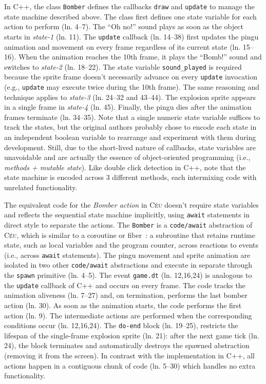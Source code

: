 \documentclass{vgtc}                          %
\newcommand{\CEU}{\textsc{C\'{e}u}\xspace}
\newcommand{\code}[1] {{\small{\texttt{#1}}}}
\begin{document}
In C++, the class \code{Bomber} defines the callbacks \code{draw} and
\code{update} to manage the state machine described above.
%
The class first defines one state variable for each action to perform
(ln. 4--7).
The ``Oh no!'' sound plays as soon as the object starts in \emph{state-1} 
(ln. 11).
The \code{update} callback (ln. 14--38) first updates the pingu animation and
movement on every frame regardless of its current state (ln. 15--16).
When the animation reaches the 10th frame, it plays the ``Bomb!'' sound and 
switches to \emph{state-2} (ln. 18--22).
The state variable \code{sound\_played} is required because the sprite frame
doesn't necessarily advance on every \code{update} invocation (e.g.,
\code{update} may execute twice during the 10th frame).
The same reasoning and technique applies to \emph{state-3} (ln. 24--32 and
43--44).
The explosion sprite appears in a single frame in \emph{state-4} (ln. 45).
Finally, the pingu dies after the animation frames terminate (ln. 34--35).
%
Note that a single numeric state variable suffices to track the states, but the
original authors probably chose to encode each state in an independent boolean 
variable to rearrange and experiment with them during development.
Still, due to the short-lived nature of callbacks, state variables are 
unavoidable and are actually the essence of object-oriented programming
(i.e., \emph{methods + mutable state}).
%
Like double click detection in C++, note that the state machine is encoded
across 3 different methods, each intermixing code with unrelated functionality.

The equivalent code for the \emph{Bomber action} in \CEU doesn't require state
variables and reflects the sequential state machine implicitly, using
\code{await} statements in direct style to separate the actions.
%
The \code{Bomber} is a \code{code/await} abstraction of \CEU, which is similar
to a coroutine or fiber~\cite{sync_async.cooperative}: a subroutine that
retains runtime state, such as local variables and the program counter, across
reactions to events (i.e., across \code{await} statements).
The pingu movement and sprite animation are isolated in two other
\code{code/await} abstractions and execute in separate through the \code{spawn}
primitive (ln. 4--5).
The event \code{game.dt} (ln. 12,16,24) is analogous to the \code{update}
callback of C++ and occurs on every frame.
%
The code tracks the animation aliveness (ln. 7--27) and, on termination,
performs the last bomber action (ln. 30).
As soon as the animation starts, the code performs the first action (ln. 9).
The intermediate actions are performed when the corresponding conditions occur
(ln. 12,16,24).
The \code{do-end} block (ln. 19--25), restricts the lifespan of the
single-frame explosion sprite (ln. 21): after the next game tick (ln. 24), the
block terminates and automatically destroys the spawned abstraction (removing
it from the screen).
%
In contrast with the implementation in C++, all actions happen in a contiguous
chunk of code (ln. 5--30) which handles no extra functionality.
\end{document}
